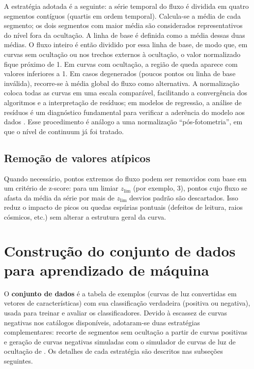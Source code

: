 A estratégia adotada é a seguinte: a série temporal do fluxo é dividida em quatro segmentos contíguos (quartis em ordem temporal). Calcula-se a média de cada segmento; os dois segmentos com maior média são considerados representativos do nível fora da ocultação. A linha de base é definida como a média dessas duas médias. O fluxo inteiro é então dividido por essa linha de base, de modo que, em curvas sem ocultação ou nos trechos externos à ocultação, o valor normalizado fique próximo de 1. Em curvas com ocultação, a região de queda aparece com valores inferiores a 1. Em casos degenerados (poucos pontos ou linha de base inválida), recorre-se à média global do fluxo como alternativa. A normalização coloca todas as curvas em uma escala comparável, facilitando a convergência dos algoritmos e a interpretação de resíduos; em modelos de regressão, a análise de resíduos é um diagnóstico fundamental para verificar a aderência do modelo aos dados \citep{Morettin2010}. Esse procedimento é análogo a uma normalização ``pós-fotometria'', em que o nível de continuum já foi tratado.

\subsection{Remoção de valores atípicos}

Quando necessário, pontos extremos do fluxo podem ser removidos com base em um critério de z-score: para um limiar \(z_{\mathrm{lim}}\) (por exemplo, 3), pontos cujo fluxo se afasta da média da série por mais de \(z_{\mathrm{lim}}\) desvios padrão são descartados. Isso reduz o impacto de picos ou quedas espúrias pontuais (defeitos de leitura, raios cósmicos, etc.) sem alterar a estrutura geral da curva.

\let\oldsectionmark\sectionmark %
\renewcommand{\sectionmark}[1]{\oldsectionmark{Construção do conjunto de dados}}
\section{Construção do conjunto de dados para aprendizado de máquina}
\let\sectionmark\oldsectionmark
\label{sec:construção_dataset}
\label{sec:construcao_dataset}

O \textbf{conjunto de dados} é a tabela de exemplos (curvas de luz convertidas em vetores de características) com sua classificação verdadeira (positiva ou negativa), usada para treinar e avaliar os classificadores. Devido à escassez de curvas negativas nos catálogos disponíveis, adotaram-se duas estratégias complementares: recorte de segmentos sem ocultação a partir de curvas positivas e geração de curvas negativas simuladas com o simulador de curvas de luz de ocultação de \citet{Simulator}. Os detalhes de cada estratégia são descritos nas subseções seguintes.

